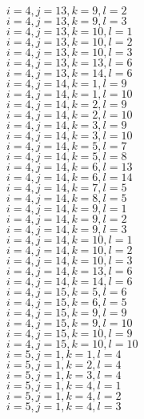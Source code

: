 \documentclass[14pt]{article}
\begin{document}
    $i=4,j=13,k=9,l=2 $ \\ 
    $i=4,j=13,k=9,l=3 $ \\ 
    $i=4,j=13,k=10,l=1 $ \\ 
    $i=4,j=13,k=10,l=2 $ \\ 
    $i=4,j=13,k=10,l=3 $ \\ 
    $i=4,j=13,k=13,l=6 $ \\ 
    $i=4,j=13,k=14,l=6 $ \\ 
    $i=4,j=14,k=1,l=9 $ \\ 
    $i=4,j=14,k=1,l=10 $ \\ 
    $i=4,j=14,k=2,l=9 $ \\ 
    $i=4,j=14,k=2,l=10 $ \\ 
    $i=4,j=14,k=3,l=9 $ \\ 
    $i=4,j=14,k=3,l=10 $ \\ 
    $i=4,j=14,k=5,l=7 $ \\ 
    $i=4,j=14,k=5,l=8 $ \\ 
    $i=4,j=14,k=6,l=13 $ \\ 
    $i=4,j=14,k=6,l=14 $ \\ 
    $i=4,j=14,k=7,l=5 $ \\ 
    $i=4,j=14,k=8,l=5 $ \\ 
    $i=4,j=14,k=9,l=1 $ \\ 
    $i=4,j=14,k=9,l=2 $ \\ 
    $i=4,j=14,k=9,l=3 $ \\ 
    $i=4,j=14,k=10,l=1 $ \\ 
    $i=4,j=14,k=10,l=2 $ \\ 
    $i=4,j=14,k=10,l=3 $ \\ 
    $i=4,j=14,k=13,l=6 $ \\ 
    $i=4,j=14,k=14,l=6 $ \\ 
    $i=4,j=15,k=5,l=6 $ \\ 
    $i=4,j=15,k=6,l=5 $ \\ 
    $i=4,j=15,k=9,l=9 $ \\ 
    $i=4,j=15,k=9,l=10 $ \\ 
    $i=4,j=15,k=10,l=9 $ \\ 
    $i=4,j=15,k=10,l=10 $ \\ 
    $i=5,j=1,k=1,l=4 $ \\ 
    $i=5,j=1,k=2,l=4 $ \\ 
    $i=5,j=1,k=3,l=4 $ \\ 
    $i=5,j=1,k=4,l=1 $ \\ 
    $i=5,j=1,k=4,l=2 $ \\ 
    $i=5,j=1,k=4,l=3 $ \\ 
\end{document}
